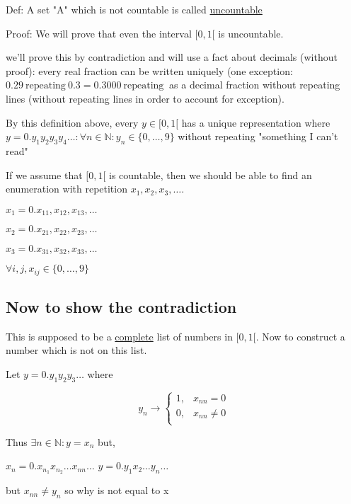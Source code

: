 \documentclass{article}
\begin{document}

Def: A set "A" which is not countable is called \underline{uncountable}

Proof: We will prove that even the interval $[0, 1[$ is uncountable.

we'll prove this by contradiction and will use a fact about decimals (without proof): every real fraction can be written uniquely (one exception: $0.29 \ \text{repeating} \ 0.3 = 0.3000 \ \text{repeating} \ $ as a decimal fraction without repeating lines (without repeating lines in order to account for exception).

By this definition above, every $y \in [0, 1[$ has a unique representation where $y = 0. y_1 y_2 y_3 y_4 \dots: \forall n \in \mathbb{N}: y_n \in \{0, \dots, 9\}$ without repeating "something I can't read"

If we assume that $[0, 1[$ is countable, then we should be able to find an enumeration with repetition $x_1, x_2, x_3, \dots$. 

$x_1 = 0. x_{11}, x_{12}, x_{13}, \dots$

$x_2 = 0. x_{21}, x_{22}, x_{23}, \dots$

$x_3 = 0. x_{31}, x_{32}, x_{33}, \dots$

$\forall i,j, x_{ij} \in \{0, \dots, 9\}$

\subsection{Now to show the contradiction}

This is supposed to be a \underline{ complete} list of numbers in $[0, 1[$. Now to construct a number which is not on this list. 

Let $y = 0. y_1 y_2 y_3 \dots$ where 

 \[y_n \to
   \begin{cases} 
     1, & x_{nn} = 0\\
     0, & x_{nn} \neq 0\\
   \end{cases}
 \]

 Thus $\exists n \in \mathbb{N}: y = x_n$ but,

 $x_n = 0 . x_{n_1} x_{n_2}\dots x_{nn} \dots $
 $y   = 0 . y_{1} x_{2}\dots y_{n} \dots $ 

 but $x_{nn} \neq y_n$ so why is not equal to x
\end{document}
